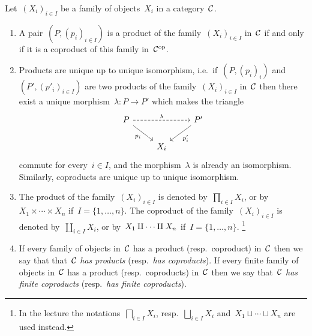\begin{remark}
  Let~$(X_i)_{i \in I}$ be a family of objects~$X_i$ in a category~$\mathcal{C}$.
  \begin{enumerate}
    \item
      A pair~$(P,(p_i)_{i \in I})$ is a product of the family~$(X_i)_{i \in I}$ in~$\mathcal{C}$ if and only if it is a coproduct of this family in~$\mathcal{C}^{\mathrm{op}}$.
    \item
      Products are unique up to unique isomorphism, i.e.\ if~$(P, (p_i)_i)$ and~$(P', (p'_i)_{i \in I})$ are two products of the family~$(X_i)_{i \in I}$ in~$\mathcal{C}$ then there exist a unique morphism~$\lambda \colon P \to P'$ which makes the triangle
      \[
        \begin{tikzcd}
            P
            \arrow[dashed]{rr}[above]{\lambda}
            \arrow{dr}[below left]{p_i}
          & {}
          & P'
            \arrow{dl}[below right]{p'_i}
          \\
            {}
          & X_i
          & {}
        \end{tikzcd}
      \]
      commute for every~$i \in I$, and the morphism~$\lambda$ is already an isomorphism.
      Similarly, coproducts are unique up to unique isomorphism.
    \item
      The product of the family~$(X_i)_{i \in I}$ is denoted by~$\prod_{i \in I} X_i$, or by~$X_1 \times \dotsb \times X_n$ if~$I = \{1, \dotsc, n\}$.
      The coproduct of the family~$(X_i)_{i \in I}$ is denoted by~$\coprod_{i \in I} X_i$, or by~$X_1 \amalg \dotsb \amalg X_n$ if~$I = \{1, \dotsc, n\}$.%
      \footnote{In the lecture the notations~$\bigsqcap_{i \in I} X_i$, resp.~$\bigsqcup_{i \in I} X_i$ and~$X_1 \sqcup \dotsb \sqcup X_n$ are used instead.}
    \item
      If every family of objects in~$\mathcal{C}$ has a product (resp.\ coproduct) in~$\mathcal{C}$ then we say that that~$\mathcal{C}$ \emph{has products} (resp.\ \emph{has coproducts}).
      If every finite family of objects in~$\mathcal{C}$ has a product (resp.\ coproducts) in~$\mathcal{C}$ then we say that~$\mathcal{C}$ \emph{has finite coproducts} (resp.\ \emph{has finite coproducts}).
  \end{enumerate}
\end{remark}


